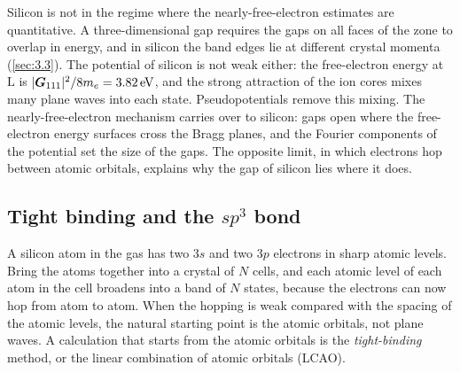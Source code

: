 Silicon is not in the regime where the nearly-free-electron estimates are quantitative. A three-dimensional gap requires the gaps on all faces of the zone to overlap in energy, and in silicon the band edges lie at different crystal momenta (\cref{sec:3.3}). The potential of silicon is not weak either: the free-electron energy at $\mathrm{L}$ is $|\bm{G}_{111}|^2/8m_e = \SI{3.82}{eV}$, and the strong attraction of the ion cores mixes many plane waves into each state. Pseudopotentials remove this mixing. The nearly-free-electron mechanism carries over to silicon: gaps open where the free-electron energy surfaces cross the Bragg planes, and the Fourier components of the potential set the size of the gaps. The opposite limit, in which electrons hop between atomic orbitals, explains why the gap of silicon lies where it does.

\subsection{Tight binding and the \texorpdfstring{$sp^3$}{sp3} bond}

A silicon atom in the gas has two $3s$ and two $3p$ electrons in sharp atomic levels. Bring the atoms together into a crystal of $N$ cells, and each atomic level of each atom in the cell broadens into a band of $N$ states, because the electrons can now hop from atom to atom. When the hopping is weak compared with the spacing of the atomic levels, the natural starting point is the atomic orbitals, not plane waves. A calculation that starts from the atomic orbitals is the \emph{tight-binding} method, or the linear combination of atomic orbitals (LCAO).

